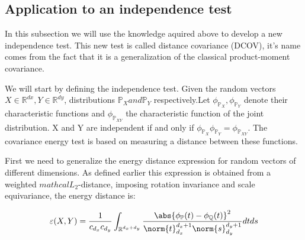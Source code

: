 \subsection{Application to an independence test}
In this subsection we will use the knowledge aquired above to develop a new independence test. This new test is called distance covariance (DCOV), it's name comes from the fact that it is a generalization of the classical product-moment covariance.

We will start by defining the independence test. Given the random vectors $X\in\mathbb{R}^{dx},Y\in\mathbb{R}^{dy}$, distributions $\mathbb{P}_{X} and \mathbb{P}_{Y}$ respectively.Let $\phi_{\mathbb{P}_{X}}, \phi_{\mathbb{P}_{Y}}$ denote their characteristic functions and $\phi_{\mathbb{P}_{XY}}$ the characteristic function of the joint distribution. X and Y are independent if and only if 
$\phi_{\mathbb{P}_{X}}\phi_{\mathbb{P}_{Y}} = \phi_{\mathbb{P}_{XY}}$. The covariance energy test is based on measuring a distance between these functions.

First we need to generalize the energy distance expression for random vectors of different dimensions. As defined earlier this expression is obtained from a weighted $mathcal{L}_{2}$-distance, imposing rotation invariance and scale equivariance, the energy distance is:
\vspace{5mm}

$$\varepsilon(X,Y) = \frac{1}{c_{d_{x}}c_{d_{y}}}\int_{\mathbb{R}^{d_{x} + d_{y}}}\frac{\abs{\phi_{\mathbb{P}}(t)-\phi_{\mathbb{Q}}(t)}^{2}}{\norm{t}^{d_{x}+1}_{d_{x}}\norm{s}^{d_{y}+1}_{d_{y}}}dtds$$


